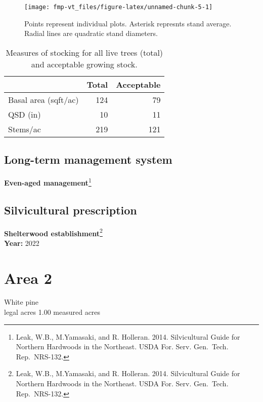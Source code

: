 \documentclass[]{tufte-handout}
\begin{document}
\begin{figure}
\texttt{[image: fmp-vt\_files/figure-latex/unnamed-chunk-5-1]} \caption[Points represent individual plots]{Points represent individual plots. Asterisk represnts stand average. Radial lines are quadratic stand diameters.}\label{fig:unnamed-chunk-5}
\end{figure}

\begin{table}

\caption{\label{tab:unnamed-chunk-6}Measures of stocking for all live trees (total) and acceptable growing stock.}
\centering
\begin{tabular}[t]{lrr}
\toprule
  & Total & Acceptable\\
\midrule
Basal area (sqft/ac) & 124 & 79\\
QSD (in) & 10 & 11\\
Stems/ac & 219 & 121\\
\bottomrule
\end{tabular}
\end{table}

\subsection{Long-term management
system}\label{long-term-management-system}

\textbf{Even-aged management}\footnote{Leak, W.B., M.Yamasaki, and R.
  Holleran. 2014. Silvicultural Guide for Northern Hardwoods in the
  Northeast. USDA For. Serv. Gen.~Tech. Rep.~NRS-132.}

\subsection{Silvicultural
prescription}\label{silvicultural-prescription}

\textbf{Shelterwood establishment}\footnote{Leak, W.B., M.Yamasaki, and
  R. Holleran. 2014. Silvicultural Guide for Northern Hardwoods in the
  Northeast. USDA For. Serv. Gen.~Tech. Rep.~NRS-132.}\\
\textbf{Year:} 2022

\newpage

\section{Area 2}\label{area-2}

White pine\\
 legal acres \textbar{} 1.00 measured acres
\end{document}
